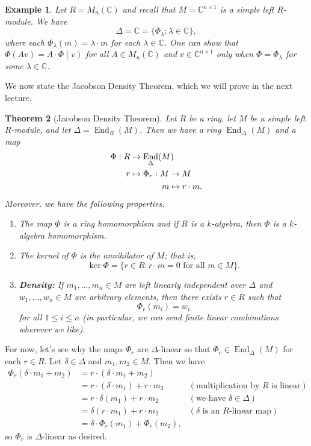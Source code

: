 \documentclass[10pt]{article}
\numberwithin{equation}{section}
\newcommand{\C}{\mathbb{C}}
\DeclareMathOperator{\End}{End}
\theoremstyle{newstyle}
\newtheorem{thm}{Theorem}[section]
\newtheorem{exmp}[thm]{Example}
\begin{document}
\begin{exmp}
Let $R = M_n(\C)$ and recall that $M = \C^{n\times 1}$ is a simple left $R$-module. We have 
\[ \Delta = \C = \{\Phi_\lambda : \lambda \in \C\}, \]
where each $\Phi_\lambda(m) = \lambda \cdot m$ for each $\lambda \in \C$. One can show that 
$\Phi(Av) = A \cdot \Phi(v)$ for all $A \in M_n(\C)$ and $v \in \C^{n\times 1}$ only when 
$\Phi = \Phi_\lambda$ for some $\lambda \in \C$. 
\end{exmp}

We now state the Jacobson Density Theorem, which we will prove in the next lecture. 

\begin{thm}[Jacobson Density Theorem]
Let $R$ be a ring, let $M$ be a simple left $R$-module, and let $\Delta = \End_R(M)$. Then we have a 
ring $\End_\Delta(M)$ and a map 
\begin{align*}
    \Phi : R &\to \End_\Delta(M) \\
    r &\mapsto \Phi_r : M \to M \\
    & \hspace{1.33cm} m \mapsto r \cdot m.
\end{align*}
Moreover, we have the following properties. 
\begin{enumerate}[(1)]
    \item The map $\Phi$ is a ring homomorphism and if $R$ is a $k$-algebra, then $\Phi$ is a 
    $k$-algebra homomorphism.
    \item The kernel of $\Phi$ is the annihilator of $M$; that is, 
    \[ \ker\Phi = \{r \in R : r \cdot m = 0 \text{ for all } m \in M\}. \]
    \item {\bf Density:} If $m_1, \dots, m_n \in M$ are left linearly independent over $\Delta$ and 
    $w_1, \dots, w_n \in M$ are arbitrary elements, then there exists $r \in R$ such that 
    \[ \Phi_r(m_i) = w_i \]
    for all $1 \leq i \leq n$ (in particular, we can send finite linear combinations wherever we like).
\end{enumerate}
\end{thm}

For now, let's see why the maps $\Phi_r$ are $\Delta$-linear so that $\Phi_r \in \End_\Delta(M)$
for each $r \in R$. 
Let $\delta \in \Delta$ and $m_1, m_2 \in M$. Then we have 
\begin{align*}
    \Phi_r(\delta \cdot m_1 + m_2) &= r \cdot (\delta \cdot m_1 + m_2) \\
    &= r \cdot (\delta \cdot m_1) + r \cdot m_2 & (\text{multiplication by $R$ is linear}) \\
    &= r \cdot \delta(m_1) + r \cdot m_2 & (\text{we have $\delta \in \Delta$}) \\
    &= \delta(r \cdot m_1) + r \cdot m_2 & (\text{$\delta$ is an $R$-linear map}) \\
    &= \delta \cdot \Phi_r(m_1 ) + \Phi_r(m_2),
\end{align*}
so $\Phi_r$ is $\Delta$-linear as desired. 
\end{document}
